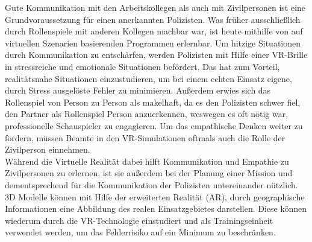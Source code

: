 Gute Kommunikation mit den Arbeitskollegen als auch mit Zivilpersonen ist eine Grundvoraussetzung für einen anerkannten Polizisten. Was früher ausschließlich durch Rollenspiele mit anderen Kollegen machbar war, ist heute mithilfe von auf virtuellen Szenarien basierenden Programmen erlernbar. Um hitzige Situationen durch Kommunikation zu entschärfen, werden Polizisten mit Hilfe einer VR-Brille in stressreiche und emotionale Situationen befördert. Das hat zum Vorteil, realitätsnahe Situationen einzustudieren, um bei einem echten Einsatz eigene, durch Stress ausgelöste Fehler zu minimieren. Außerdem erwies sich das Rollenspiel von Person zu Person als makelhaft, da es den Polizisten schwer fiel, den Partner als Rollenspiel Person anzuerkennen, weswegen es oft nötig war, professionelle Schauspieler zu engagieren. Um das empathische Denken weiter zu fördern, müssen Beamte in den VR-Simulationen oftmals auch die Rolle der Zivilperson einnehmen. \cite{kohl2023empathy}
\\
Während die Virtuelle Realität dabei hilft Kommunikation und Empathie zu Zivilpersonen zu erlernen, ist sie außerdem bei der Planung einer Mission und dementsprechend für die Kommunikation der Polizisten untereinander nützlich. 3D Modelle können mit Hilfe der erweiterten Realität (AR), durch geographische Informationen eine Abbildung des realen Einsatzgebietes darstellen. Diese können wiederum durch die VR-Technologie einstudiert und als Trainingseinheit verwendet werden, um das Fehlerrisiko auf ein Minimum zu beschränken.\cite{amorim2013augmented}
